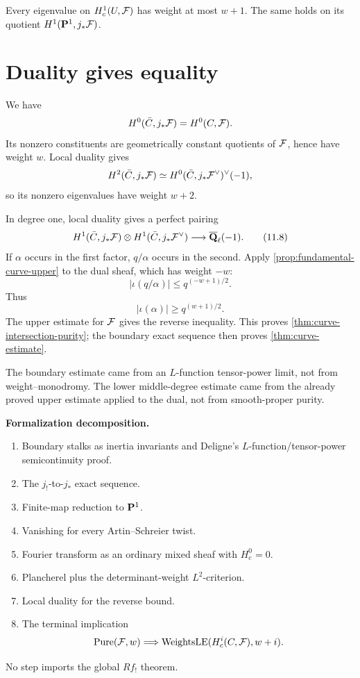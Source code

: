 \begin{proposition}
\label{prop:fundamental-curve-upper}
Every eigenvalue on \(H_c^1(U,\mathcal F)\) has weight at most \(w+1\).  The
same holds on its quotient \(H^1(\mathbf P^1,j_*\mathcal F)\).
\end{proposition}

\section{Duality gives equality}

We have
\[
 H^0(\bar C,j_*\mathcal F)=H^0(C,\mathcal F).
\]
Its nonzero constituents are geometrically constant quotients of
\(\mathcal F\), hence have weight \(w\).  Local duality gives
\[
 H^2(\bar C,j_*\mathcal F)
 \simeq H^0(\bar C,j_*\mathcal F^\vee)^\vee(-1),
\]
so its nonzero eigenvalues have weight \(w+2\).

In degree one, local duality gives a perfect pairing
\[
 H^1(\bar C,j_*\mathcal F)\otimes
 H^1(\bar C,j_*\mathcal F^\vee)
 \longrightarrow\overline{\mathbf Q}_\ell(-1).
\tag{11.8}\label{eq:curve-local-duality}
\]
If \(\alpha\) occurs in the first factor, \(q/\alpha\) occurs in the
second.  Apply \cref{prop:fundamental-curve-upper} to the dual sheaf,
which has weight \(-w\):
\[
 |\iota(q/\alpha)|\le q^{(-w+1)/2}.
\]
Thus
\[
 |\iota(\alpha)|\ge q^{(w+1)/2}.
\]
The upper estimate for \(\mathcal F\) gives the reverse inequality.  This
proves \cref{thm:curve-intersection-purity}; the boundary exact sequence
then proves \cref{thm:curve-estimate}.

\begin{warning}
\label{warn:curve-proof-noncircular}
The boundary estimate came from an \(L\)-function tensor-power limit,
not from weight--monodromy.  The lower middle-degree estimate came from
the already proved upper estimate applied to the dual, not from
smooth-proper purity.
\end{warning}

\begin{formalization}
\label{form:curve-estimate-interface}
\textbf{Formalization decomposition.}
\begin{enumerate}
\item Boundary stalks as inertia invariants and Deligne's
\(L\)-function/tensor-power semicontinuity proof.
\item The \(j_!\)-to-\(j_*\) exact sequence.
\item Finite-map reduction to \(\mathbf P^1\).
\item Vanishing for every Artin--Schreier twist.
\item Fourier transform as an ordinary mixed sheaf with \(H_c^0=0\).
\item Plancherel plus the determinant-weight \(L^2\)-criterion.
\item Local duality for the reverse bound.
\item The terminal implication
\[
 \operatorname{Pure}(\mathcal F,w)
 \Longrightarrow
 \operatorname{WeightsLE}(H_c^i(C,\mathcal F),w+i).
\]
\end{enumerate}
No step imports the global \(Rf_!\) theorem.
\end{formalization}
